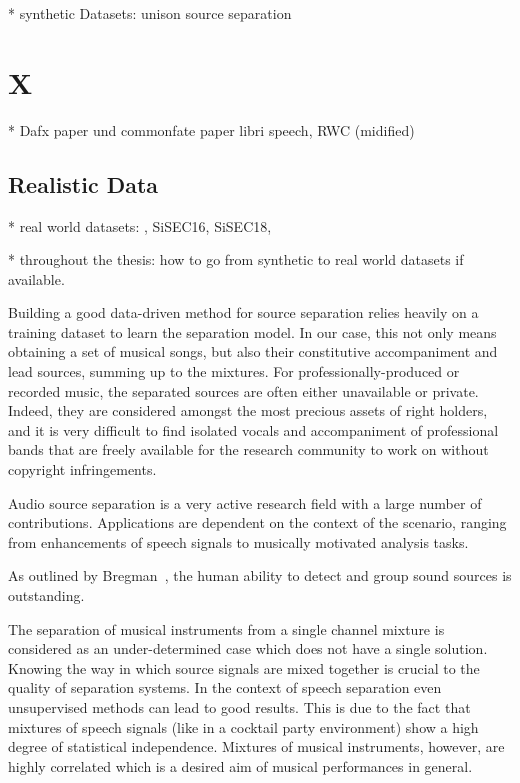 * synthetic Datasets: unison source separation~\chapter{X}
* Dafx paper und commonfate paper
libri speech, RWC (midified)

\section{Realistic Data}


* real world datasets: , SiSEC16, SiSEC18,

* throughout the thesis: how to go from synthetic to real world datasets if available.

Building a good data-driven method for source separation relies heavily on a training dataset to learn the separation model. In our case, this not only means obtaining a set of musical songs, but also their constitutive accompaniment and lead sources, summing up to the mixtures. For professionally-produced or recorded music, the separated sources are often either unavailable or private. Indeed, they are considered amongst the most precious assets of right holders, and it is very difficult to find isolated vocals and accompaniment of professional bands that are freely available for the research community to work on without copyright infringements.


Audio source separation is a very active research field with a large number of contributions. Applications are dependent on the context of the scenario, ranging from enhancements of speech signals to musically motivated analysis tasks.

As outlined by Bregman~\cite{bregman94}, the human ability to detect and group sound sources is outstanding.

The separation of musical instruments from a single channel mixture is considered as an under-determined case which does not have a single solution. Knowing the way in which source signals are mixed together is crucial to the quality of separation systems. In the context of speech separation even unsupervised methods can lead to good results. This is due to the fact that mixtures of speech signals (like in a cocktail party environment) show a high degree of statistical independence. Mixtures of musical instruments, however, are highly correlated which is a desired aim of musical performances in general.

